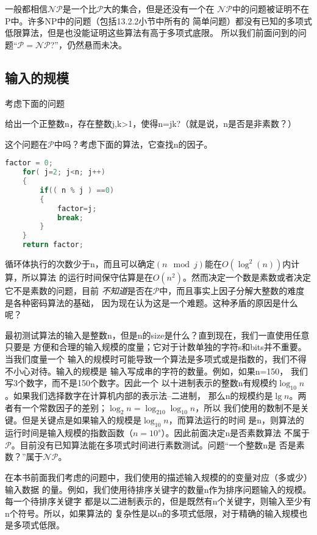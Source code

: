 一般都相信$\mathcal{NP}$是一个比$\mathcal{P}$大的集合，但是还没有一个在
$\mathcal{NP}$中的问题被证明不在P中。许多NP中的问题（包括13.2.2小节中所有的
简单问题）都没有已知的多项式低限算法，但是也没能证明这些算法有高于多项式底限。
所以我们前面问到的问题“$\mathcal{P}=\mathcal{NP}$?”，仍然悬而未决。

\subsection{输入的规模}
考虑下面的问题
\begin{problem}\vspace{1ex}
给出一个正整数n，存在整数j,k>1，使得n=jk?（就是说，n是否是非素数？）
\end{problem}
这个问题在$\mathcal{P}$中吗？考虑下面的算法，它查找n的因子。
\begin{lstlisting}[language={Java},keywordstyle=\color{blue!70}, commentstyle=\color{red!50!green!50!blue!50}]
    factor = 0;
    for( j=2; j<n; j++)
    {
        if(( n % j ) ==0)
        {
            factor=j;
            break;
        }
    }
    return factor;
\end{lstlisting}
循环体执行的次数少于n，而且可以确定$(n \mod j)$能在$O(\log^2(n))$内计算，所以算法
的运行时间保守估算是在$O(n^2)$。然而决定一个数是素数或者决定它不是素数的问题，目前
\emph{不知道}是否在$\mathcal{P}$中，而且事实上因子分解大整数的难度是各种密码算法的基础，
因为现在认为这是一个难题。这种矛盾的原因是什么呢？

最初测试算法的输入是整数n，但是n的size是什么？直到现在，我们一直使用任意只要是
方便和合理的输入规模的度量；它对于计数单独的字符s和bits并不重要。当我们度量一个
输入的规模时可能导致一个算法是多项式或是指数的，我们不得不小心对待。输入的规模是
输入写成串的字符的数量。例如，如果n=150， 我们写3个数字，而不是150个数字。因此一个
以十进制表示的整数n有规模约$\log_10n$。如果我们选择数字在计算机内部的表示法--二进制，
那么n的规模约是$\lg n$。两者有一个常数因子的差别；$\log_2n=\log_210\log_10n$，所以
我们使用的数制不是关键。但是关键点是如果输入的规模是$\log_10n$，而算法运行的时间
是n，则算法的运行时间是输入规模的指数函数（$n=10^s$）。因此前面决定n是否素数算法
不属于$\mathcal{P}$。目前没有已知算法能在多项式时间进行素数测试。问题“一个整数n是
否是素数？”属于$\mathcal{NP}$。

在本书前面我们考虑的问题中，我们使用的描述输入规模的的变量对应（多或少）输入数据
的量。例如，我们使用待排序关键字的数量n作为排序问题输入的规模。 每一个待排序关键字
都是以二进制表示的，但是既然有n个关键字，则输入至少有n个符号。所以，如果算法的
复杂性是以n的多项式低限，对于精确的输入规模也是多项式低限。

